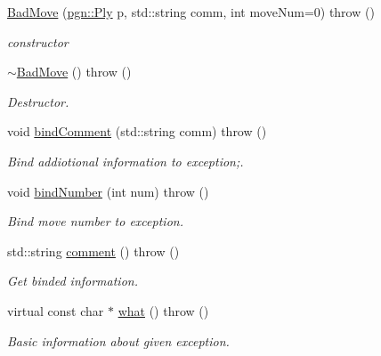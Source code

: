 \begin{DoxyCompactItemize}
\item 
\hyperlink{classChEngn_1_1BadMove_a581052f5203836b164bf25ce6e3e6b7a}{BadMove} (\hyperlink{classpgn_1_1Ply}{pgn::Ply} p, std::string comm, int moveNum=0)  throw ()
\begin{DoxyCompactList}\small\item\em constructor \item\end{DoxyCompactList}\item 
\hypertarget{classChEngn_1_1BadMove_a6efb8ca7c4af455b042eddf7ebbf2837}{
\hyperlink{classChEngn_1_1BadMove_a6efb8ca7c4af455b042eddf7ebbf2837}{$\sim$BadMove} ()  throw ()}
\label{classChEngn_1_1BadMove_a6efb8ca7c4af455b042eddf7ebbf2837}

\begin{DoxyCompactList}\small\item\em Destructor. \item\end{DoxyCompactList}\item 
void \hyperlink{classChEngn_1_1BadMove_a0006497750a3d96218b1dad586f5f8f1}{bindComment} (std::string comm)  throw ()
\begin{DoxyCompactList}\small\item\em Bind addiotional information to exception;. \item\end{DoxyCompactList}\item 
void \hyperlink{classChEngn_1_1BadMove_a1de119e2f1144a0e6906940df02bdaf8}{bindNumber} (int num)  throw ()
\begin{DoxyCompactList}\small\item\em Bind move number to exception. \item\end{DoxyCompactList}\item 
\hypertarget{classChEngn_1_1BadMove_a89df0bcb37e85792fd07e253503b4038}{
std::string \hyperlink{classChEngn_1_1BadMove_a89df0bcb37e85792fd07e253503b4038}{comment} ()  throw ()}
\label{classChEngn_1_1BadMove_a89df0bcb37e85792fd07e253503b4038}

\begin{DoxyCompactList}\small\item\em Get binded information. \item\end{DoxyCompactList}\item 
\hypertarget{classChEngn_1_1BadMove_ae7c3114036a9917a5aef4458a8f567d3}{
virtual const char $\ast$ \hyperlink{classChEngn_1_1BadMove_ae7c3114036a9917a5aef4458a8f567d3}{what} ()  throw ()}
\label{classChEngn_1_1BadMove_ae7c3114036a9917a5aef4458a8f567d3}

\begin{DoxyCompactList}\small\item\em Basic information about given exception. \item\end{DoxyCompactList}\end{DoxyCompactItemize}


